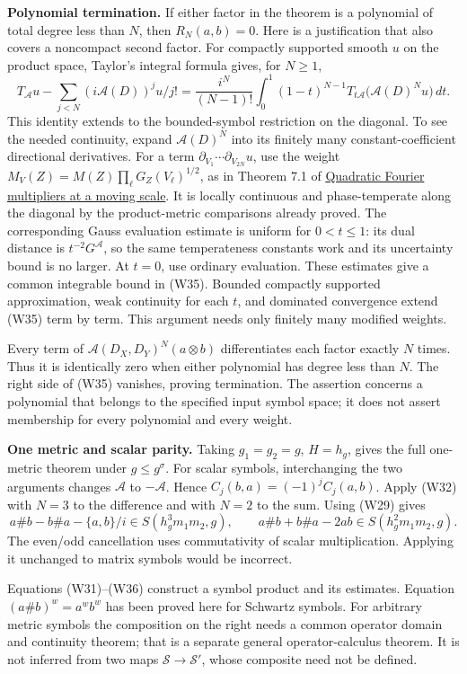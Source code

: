 \documentclass[
  11pt,
]{article}
\begin{document}
\textbf{Polynomial termination.} If either factor in the theorem is a
polynomial of total degree less than \(N\), then \(R_N(a,b)=0\). Here is
a justification that also covers a noncompact second factor. For
compactly supported smooth \(u\) on the product space, Taylor's integral
formula gives, for \(N\geq1\), \[
T_{\mathcal A}u-\sum_{j<N}(i\mathcal A(D))^ju/j!
=\frac{i^N}{(N-1)!}\int_0^1(1-t)^{N-1}
T_{t\mathcal A}\big(\mathcal A(D)^Nu\big)\,dt.
\tag{W35}
\] This identity extends to the bounded-symbol restriction on the
diagonal. To see the needed continuity, expand \(\mathcal A(D)^N\) into
its finitely many constant-coefficient directional derivatives. For a
term \(\partial_{V_1}\cdots\partial_{V_{2N}}u\), use the weight
\(M_V(Z)=M(Z)\prod_\ell G_Z(V_\ell)^{1/2}\), as in Theorem 7.1 of
\href{gauss-transform-estimates.pdf}{Quadratic Fourier multipliers at a
moving scale}. It is locally continuous and phase-temperate along the
diagonal by the product-metric comparisons already proved. The
corresponding Gauss evaluation estimate is uniform for \(0< t\leq1\):
its dual distance is \(t^{-2}G^{\mathcal A}\), so the same temperateness
constants work and its uncertainty bound is no larger. At \(t=0\), use
ordinary evaluation. These estimates give a common integrable bound in
(W35). Bounded compactly supported approximation, weak continuity for
each \(t\), and dominated convergence extend (W35) term by term. This
argument needs only finitely many modified weights.

Every term of \(\mathcal A(D_X,D_Y)^N(a\otimes b)\) differentiates each
factor exactly \(N\) times. Thus it is identically zero when either
polynomial has degree less than \(N\). The right side of (W35) vanishes,
proving termination. The assertion concerns a polynomial that belongs to
the specified input symbol space; it does not assert membership for
every polynomial and every weight.

\textbf{One metric and scalar parity.} Taking \(g_1=g_2=g\), \(H=h_g\),
gives the full one-metric theorem under \(g\leq g^\sigma\). For scalar
symbols, interchanging the two arguments changes \(\mathcal A\) to
\(-\mathcal A\). Hence \(C_j(b,a)=(-1)^jC_j(a,b)\). Apply (W32) with
\(N=3\) to the difference and with \(N=2\) to the sum. Using (W29) gives
\[
a\#b-b\#a-\{a,b\}/i\in S(h_g^3m_1m_2,g),
\qquad
a\#b+b\#a-2ab\in S(h_g^2m_1m_2,g).
\tag{W36}
\] The even/odd cancellation uses commutativity of scalar
multiplication. Applying it unchanged to matrix symbols would be
incorrect.

Equations (W31)--(W36) construct a symbol product and its estimates.
Equation \((a\#b)^w=a^wb^w\) has been proved here for Schwartz symbols.
For arbitrary metric symbols the composition on the right needs a common
operator domain and continuity theorem; that is a separate general
operator-calculus theorem. It is not inferred from two maps
\(\mathcal S\to\mathcal S'\), whose composite need not be defined.
\end{document}
